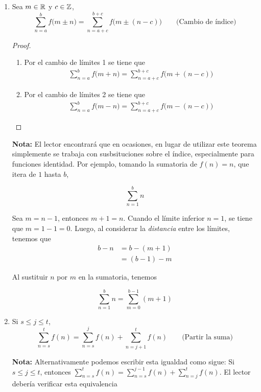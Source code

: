\begin{enumerate}[label=\alph*)]
  \item Sea $m\in \mathbb{R}$ y $c\in \mathbb{Z}$, \[\sum_{n=a}^{b}f\bigl(m\pm n\bigr) = \sum_{n=a+c}^{b+c}f\bigl(m\pm (n- c)\bigr) \qquad \text{(Cambio de índice)}\]
  \begin{proof}\leavevmode
    \begin{enumerate}[label=\roman*)]
      \item Por el cambio de límites 1 se tiene que 
      \begin{align*}
        \sum_{n=a}^{b}f\bigl(m+ n\bigr) = \sum_{n=a+c}^{b+c}f\bigl(m+ (n- c)\bigr)
      \end{align*}
      \item Por el cambio de límites 2 se tiene que
      \begin{align*}
        \sum_{n=a}^{b}f\bigl(m-n\bigr) = \sum_{n=a+c}^{b+c}f\bigl(m-(n- c)\bigr)
      \end{align*}
    \end{enumerate}
  \end{proof}

  \textbf{Nota:} El lector encontrará que en ocasiones, en lugar de utilizar este teorema simplemente se trabaja con susbsituciones sobre el índice, especialmente para funciones identidad. Por ejemplo, tomando la sumatoria de $f(n)=n$, que itera de $1$ hasta $b$,
  
  \[\sum_{n=1}^{b} n\]
  
  Sea $m=n-1$, entonces $m+1=n$. Cuando el límite inferior $n=1$, se tiene que $m=1-1=0$. Luego, al considerar la \textit{distancia} entre los límites, tenemos que
  \begin{align*}
    b - n &= b - (m+1)\\
    &= (b-1) - m
  \end{align*}
  
  Al sustituir $n$ por $m$ en la sumatoria, tenemos
  
  \[\sum_{n=1}^{b} n = \sum_{m=0}^{b-1} (m+1)\]

  \item Si $s\leq j\leq t$, \[\sum_{n=s}^{t}f(n) = \sum_{n=s}^{j}f(n) + \sum_{n=j+1}^{t}f(n) \qquad \text{(Partir la suma)}\]
  
  \textbf{Nota:} Alternativamente podemos escribir esta igualdad como sigue: Si $s\leq j\leq t$, entonces $\sum_{n=s}^{t}f(n) = \sum_{n=s}^{j-1}f(n) + \sum_{n=j}^{t}f(n)$. El lector debería verificar esta equivalencia


\end{enumerate}
